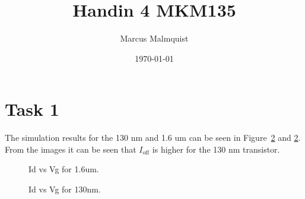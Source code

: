 \documentclass[12pt,a4paper]{article}
\title{Handin 4 MKM135}
\author{Marcus Malmquist}
\date{\today}
\begin{document}
\maketitle
\section{Task 1}
The simulation results for the 130 nm and 1.6 um can be seen in Figure~\ref{fig:idvg130_1} and \ref{fig:idvg130_1}.
From the images it can be seen that $I_{\text{off}}$ is higher for the 130 nm transistor.
\begin{figure}[!ht]
  \centering
  \noindent{}
  \caption{Id vs Vg for 1.6um.}
  \label{fig:idvg130_1}
\end{figure}
\begin{figure}[!ht]
  \centering
  \noindent{}
  \caption{Id vs Vg for 130nm.}
  \label{fig:idvg130_1}
\end{figure}
\end{document}
